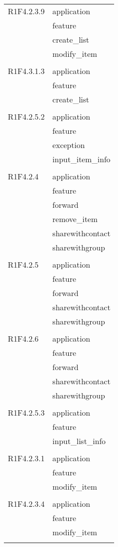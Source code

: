 \begin{center}
\begin{longtable}{|p{7cm}|p{5cm}|}
		R1F4.2.3.9 & application \\ & feature \\ & create\_list \\ & modify\_item \\ & \\ \hline
		R1F4.3.1.3 & application \\ & feature \\ & create\_list \\ & \\ \hline
		R1F4.2.5.2 & application \\ & feature \\ & exception \\ & input\_item\_info \\ & \\ \hline
		R1F4.2.4 & application \\ & feature \\ & forward \\ & remove\_item \\ & sharewithcontact \\ & sharewithgroup \\ & \\ \hline
		R1F4.2.5 & application \\ & feature \\ & forward \\ & sharewithcontact \\ & sharewithgroup \\ & \\ \hline
		R1F4.2.6 & application \\ & feature \\ & forward \\ & sharewithcontact \\ & sharewithgroup \\ & \\ \hline
		R1F4.2.5.3 & application \\ & feature \\ & input\_list\_info \\ & \\ \hline
		R1F4.2.3.1 & application \\ & feature \\ & modify\_item \\ & \\ \hline
		R1F4.2.3.4 & application \\ & feature \\ & modify\_item \\ & \\ \hline

\end{longtable}
\end{center}
